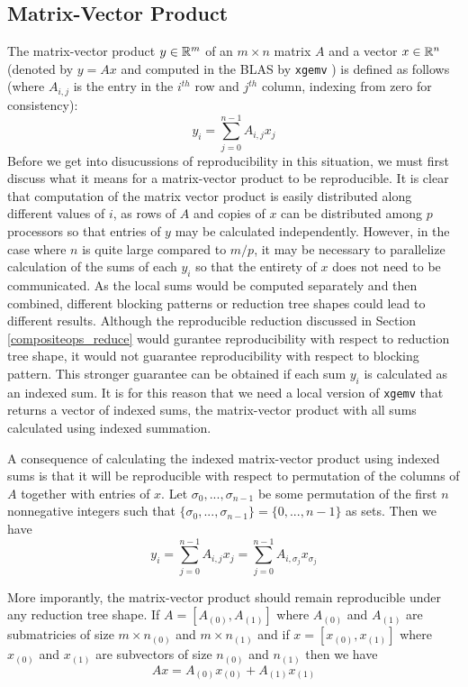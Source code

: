 \subsection{Matrix-Vector Product}
  \label{sec:compositeops_gemv}
  The matrix-vector product $y \in \mathbb{R}^m$ of an $m \times n$ matrix $A$ and a vector $x \in \mathbb{R}^n$ (denoted by $y = Ax$ and computed in the BLAS by \texttt{xgemv} \cite{BLAS}) is defined as follows (where $A_{i, j}$ is the entry in the $i^{th}$ row and $j^{th}$ column, indexing from zero for consistency):
  \[
    y_i = \sum\limits_{j = 0}^{n - 1} A_{i, j}x_j
  \]
  Before we get into disucussions of reproducibility in this situation, we must first discuss what it means for a matrix-vector product to be reproducible.
  It is clear that computation of the matrix vector product is easily distributed along different values of $i$, as rows of $A$ and copies of $x$ can be distributed among $p$ processors so that entries of $y$ may be calculated independently.
  However, in the case where $n$ is quite large compared to $m/p$, it may be necessary to parallelize calculation of the sums of each $y_i$ so that the entirety of $x$ does not need to be communicated.
  As the local sums would be computed separately and then combined, different blocking patterns or reduction tree shapes could lead to different results.
  Although the reproducible reduction discussed in Section \ref{compositeops_reduce} would gurantee reproducibility with respect to reduction tree shape, it would not guarantee reproducibility with respect to blocking pattern. This stronger guarantee can be obtained if each sum $y_i$ is calculated as an indexed sum.
  It is for this reason that we need a local version of \texttt{xgemv} that returns a vector of indexed sums, the matrix-vector product with all sums calculated using indexed summation.

  A consequence of calculating the indexed matrix-vector product using indexed sums is that it will be reproducible with respect to permutation of the columns of $A$ together with entries of $x$.
  Let $\sigma_0, ..., \sigma_{n - 1}$ be some permutation of the first $n$ nonnegative integers such that $\{\sigma_0, ..., \sigma_{n - 1}\} = \{0, ..., n - 1\}$ as sets. Then we have
  \[
    y_i = \sum\limits_{j = 0}^{n - 1} A_{i, j}x_j = \sum\limits_{j = 0}^{n - 1} A_{i, \sigma_j}x_{\sigma_j}
  \]

  More imporantly, the matrix-vector product should remain reproducible under any reduction tree shape.
  If $A = [A_{(0)}, A_{(1)}]$ where $A_{(0)}$ and $A_{(1)}$ are submatricies of size $m \times n_{(0)}$ and $m \times n_{(1)}$ and if $x = [x_{(0)}, x_{(1)}]$ where $x_{(0)}$ and $x_{(1)}$ are subvectors of size $n_{(0)}$ and $n_{(1)}$ then we have 
  \[
    Ax = A_{(0)}x_{(0)} + A_{(1)}x_{(1)}
  \]

